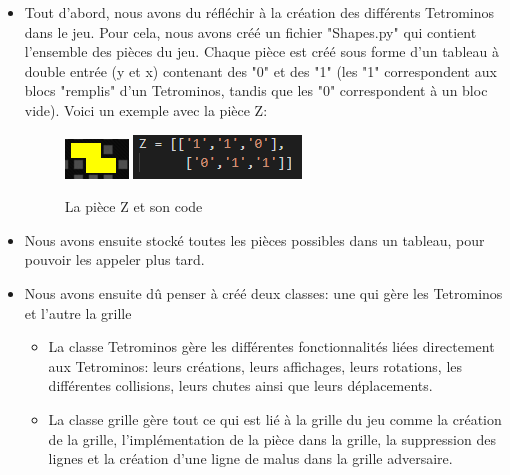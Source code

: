 \documentclass[a4paper, 11pt]{article}
\begin{document}
            \begin{itemize}
                \item Tout d'abord, nous avons du réfléchir à la création des différents Tetrominos dans le jeu. Pour cela, nous avons créé un fichier "Shapes.py" qui contient l'ensemble des pièces du jeu. Chaque pièce est créé sous forme d'un tableau à double entrée (y et x) contenant des "0" et des "1" (les "1" correspondent aux blocs "remplis" d'un Tetrominos, tandis que les "0" correspondent à un bloc vide). Voici un exemple avec la pièce Z:
                
                \begin{figure}[ht]
                    \centering
                    	\includegraphics[scale=0.8]{images/CapturePiece.png}
                    	\includegraphics[scale=0.8]{images/PieceCode.png}
                    \caption{La pièce Z et son code}
                \end{figure}
                
                \item Nous avons ensuite stocké toutes les pièces possibles dans un tableau, pour pouvoir les appeler plus tard.
                \item Nous avons ensuite dû penser à créé deux classes: une qui gère les Tetrominos et l'autre la grille
            		
                	\begin{itemize}
                		\item La classe Tetrominos gère les différentes fonctionnalités liées directement aux Tetrominos: leurs créations, leurs affichages, leurs rotations, les différentes collisions, leurs chutes ainsi que leurs déplacements.
                		\item La classe grille gère tout ce qui est lié à la grille du jeu comme la création de la grille, l'implémentation de la pièce dans la grille, la suppression des lignes et la création d'une ligne de malus dans la grille adversaire.
                		\newline
                	\end{itemize}
                \end{itemize}
            
\end{document}
